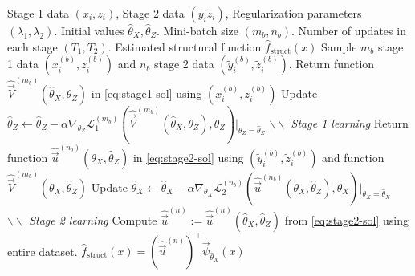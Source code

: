  \begin{algorithm}
 \caption{Deep Feature Instrumental Variable Regression}
 \begin{algorithmic}[1]  \label{algo}
 \renewcommand{\algorithmicrequire}{\textbf{Input:}}
 \renewcommand{\algorithmicensure}{\textbf{Output:}}
 \REQUIRE Stage 1 data $(x_i, z_i)$, Stage 2 data $(\tilde y_i \tilde z_i)$, Regularization parameters $(\lambda_1, \lambda_2)$. Initial values $\hat{\theta}_X,\hat{\theta}_Z$. Mini-batch size $(m_b, n_b)$. Number of updates in each stage $(T_1, T_2)$.
 \ENSURE Estimated structural function $\hat{f}_\mathrm{struct}(x)$
 \REPEAT
   \STATE Sample $m_b$ stage 1 data $(x^{(b)}_i, z^{(b)}_i)$ and  $n_b$ stage 2 data $(\tilde y^{(b)}_i, \tilde z^{(b)}_i)$.
    \STATE Return function $\hat{\vec{V}}^{(m_b)}(\hat{\theta}_X,\theta_Z)$ in \eqref{eq:stage1-sol}  using $(x^{(b)}_i, z^{(b)}_i)$
    \STATE Update $\hat{\theta}_Z \leftarrow \hat{\theta}_Z - \alpha \nabla_{\theta_Z} \mathcal{L}^{(m_b)}_1(\hat{\vec{V}}^{(m_b)}(\hat{\theta}_X,\theta_Z), \theta_Z)|_{\theta_Z=\hat{\theta}_Z}$ \hspace{5mm}\textit{$\backslash\backslash$ Stage 1 learning}
  \ENDFOR
    \STATE Return function $\hat{\vec{u}}^{(n_b)}(\theta_X,\hat{\theta}_Z)$ in  \eqref{eq:stage2-sol} using $ (\tilde y^{(b)}_i, \tilde z^{(b)}_i)$ and function $\hat{\vec{V}}^{(m_b)}(\theta_X,\hat\theta_Z)$\!
    \STATE Update $\hat{\theta}_X \leftarrow \hat{\theta}_X -\alpha\nabla_{\theta_X} \mathcal{L}^{(n_b)}_2(\hat{\vec{u}}^{(n_b)}(\theta_X,\hat{\theta}_Z), \theta_X)|_{\theta_X=\hat{\theta}_X}$ \hspace{5mm}\textit{$\backslash\backslash$ Stage 2 learning}
  \ENDFOR
  \STATE Compute $\hat{\vec{u}}^{(n)}:=\hat{\vec{u}}^{(n)}(\hat{\theta}_X,\hat{\theta}_Z)$ from \eqref{eq:stage2-sol} using entire dataset.
 \RETURN $\hat{f}_\mathrm{struct}(x) = (\hat{\vec{u}}^{(n)})^\top \vec{\psi}_{\hat{\theta}_X}(x)$
 \end{algorithmic} 
 \end{algorithm}
